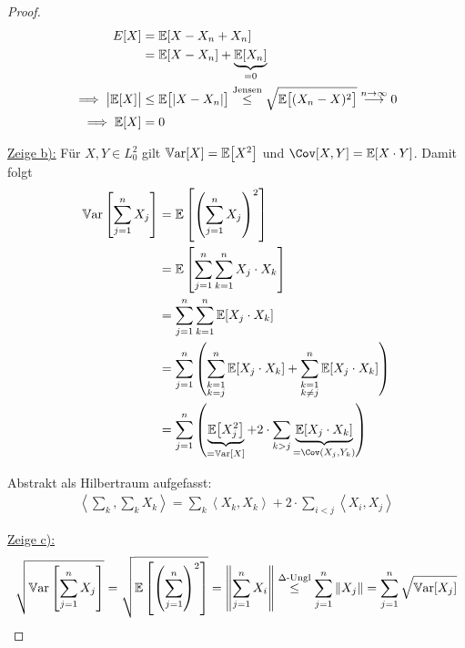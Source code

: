 \documentclass[12pt,a4paper]{article}
\begin{document}
\begin{proof}

\begin{align*}
E[X]
&=\mathbb{E}[X-X_n+X_n]\\ 
&=\mathbb{E}[X-X_n]+\underbrace{\mathbb{E}[X_n]}_{=0}\\
\implies
\big|\mathbb{E}[X]\big|&\leq \mathbb{E}\big[|X-X_n|\big]
\stackrel{\text{Jensen}}{\leq}
\sqrt{\mathbb{E}\big[(X_n-X)^2\big]}
\stackrel{n\to\infty}{\longrightarrow} 0\\
\implies
\mathbb{E}[X]&=0
\end{align*}

\underline{Zeige b):} Für $X,Y\in L_0^2$ gilt $\mathbb{V}\text{ar}[X]=\mathbb{E}\big[X^2\big]$ und $\Cov[X,Y]=\E[X\cdot Y]$. Damit folgt
\begin{align*}
\Var\left[\sum\limits_{j=1}^n X_j\right]
&=\E\left[\left(\sum\limits_{j=1}^n X_j\right)^2\right]\\
&=\E\left[\sum\limits_{j=1}^n\sum\limits_{k=1}^n X_j\cdot X_k\right]\\
&=\sum\limits_{j=1}^n\sum\limits_{k=1}^n \E[X_j\cdot X_k]\\
&=\sum\limits_{j=1}^n\left(
\sum\limits_{\begin{subarray}{c}k=1\\ k=j\end{subarray}}^n \E[X_j\cdot X_k]
+\sum\limits_{\begin{subarray}{c}k=1\\ k\neq j\end{subarray}}^n \E[X_j\cdot X_k]\right)\\
&=\sum\limits_{j=1}^n\left(\underbrace{\E\big[X_j^2\big]}_{=\Var[X]}+2\cdot\sum\limits_{k>j}\underbrace{\E[X_j\cdot X_k]}_{=\Cov(X_j,Y_k)}\right)
\end{align*}

Abstrakt als Hilbertraum aufgefasst:
\begin{align*}
\left\langle\sum\limits_{k},\sum\limits_{k} X_k\right\rangle
=\sum\limits_k\left\langle X_k,X_k\right\rangle+2\cdot\sum\limits_{i<j}\left\langle X_i,X_j\right\rangle
\end{align*}

\underline{Zeige c):}\\
\begin{align*}
\sqrt{\mathbb{V}\text{ar}\left[\sum\limits_{j=1}^n X_j\right]}
=\sqrt{\mathbb{E}\left[\left(\sum\limits_{j=1}^n\right)^2\right]}
=\left\Vert\sum\limits_{j=1}^n X_i\right\Vert
\stackrel{\Delta\text{-Ungl}}{\leq}
\sum\limits_{j=1}^n\Vert X_j\Vert
=\sum\limits_{j=1}^n\sqrt{\mathbb{V}\text{ar}[X_j]}
\end{align*}
\end{proof}
\end{document}
